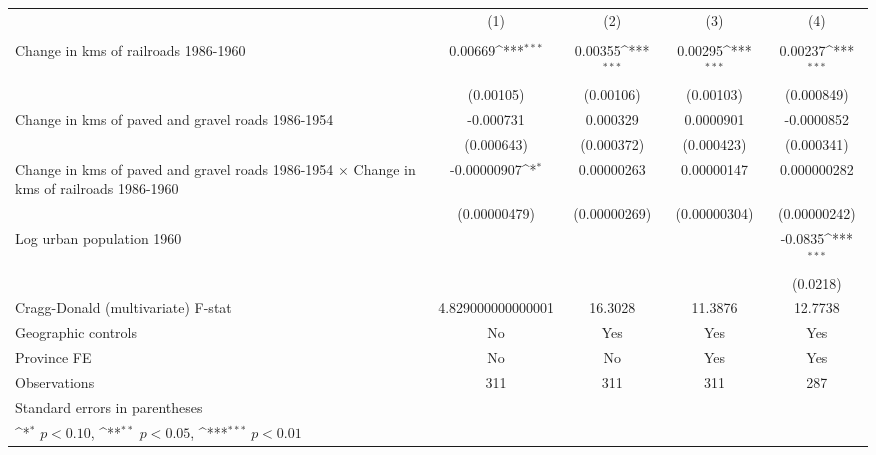 {
\def\sym#1{\ifmmode^{#1}\else\(^{#1}\)\fi}
\begin{tabular}{l*{4}{c}}
\hline\hline
                &\multicolumn{1}{c}{(1)}&\multicolumn{1}{c}{(2)}&\multicolumn{1}{c}{(3)}&\multicolumn{1}{c}{(4)}\\
                &\multicolumn{1}{c}{}&\multicolumn{1}{c}{}&\multicolumn{1}{c}{}&\multicolumn{1}{c}{}\\
\hline
Change in kms of railroads 1986-1960&  0.00669\sym{***}&  0.00355\sym{***}&  0.00295\sym{***}&  0.00237\sym{***}\\
                &(0.00105)         &(0.00106)         &(0.00103)         &(0.000849)         \\
[1em]
Change in kms of paved and gravel roads 1986-1954&-0.000731         & 0.000329         &0.0000901         &-0.0000852         \\
                &(0.000643)         &(0.000372)         &(0.000423)         &(0.000341)         \\
[1em]
Change in kms of paved and gravel roads 1986-1954 $\times$ Change in kms of railroads 1986-1960&-0.00000907\sym{*}  &0.00000263         &0.00000147         &0.000000282         \\
                &(0.00000479)         &(0.00000269)         &(0.00000304)         &(0.00000242)         \\
[1em]
Log urban population 1960&                  &                  &                  &  -0.0835\sym{***}\\
                &                  &                  &                  & (0.0218)         \\
\hline
Cragg-Donald (multivariate) F-stat&4.829000000000001         &  16.3028         &  11.3876         &  12.7738         \\
Geographic controls&       No         &      Yes         &      Yes         &      Yes         \\
Province FE     &       No         &       No         &      Yes         &      Yes         \\
Observations    &      311         &      311         &      311         &      287         \\
\hline\hline
\multicolumn{5}{l}{\footnotesize Standard errors in parentheses}\\
\multicolumn{5}{l}{\footnotesize \sym{*} \(p<0.10\), \sym{**} \(p<0.05\), \sym{***} \(p<0.01\)}\\
\end{tabular}
}
